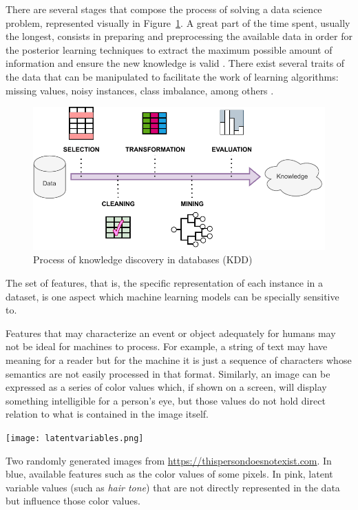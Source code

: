 There are several stages that compose the process of solving a data science problem, represented visually in Figure~\ref{fig:kdd}. A great part of the time spent, usually the longest, consists in preparing and preprocessing the available data in order for the posterior learning techniques to extract the maximum possible amount of information and ensure the new knowledge is valid . There exist several traits of the data that can be manipulated to facilitate the work of learning algorithms: missing values, noisy instances, class imbalance, among others .

\begin{figure}
    \includegraphics[width=\linewidth]{images/kddprocess.pdf}
    \caption{\label{fig:kdd}Process of knowledge discovery in databases (KDD)}
\end{figure}

The set of features, that is, the specific representation of each instance in a dataset, is one aspect which machine learning models can be specially sensitive to.

Features that may characterize an event or object adequately for humans may not be ideal for machines to process. For example, a string of text may have meaning for a reader but for the machine it is just a sequence of characters whose semantics are not easily processed in that format. Similarly, an image can be expressed as a series of color values which, if shown on a screen, will display something intelligible for a person's eye, but those values do not hold direct relation to what is contained in the image itself.

\begin{marginfigure}
\texttt{[image: latentvariables.png]}
\caption{\label{fig:latentfaces}Two randomly generated images from \url{https://thispersondoesnotexist.com}. In blue, available features such as the color values of some pixels. In pink, latent variable values (such as \textit{hair tone}) that are not directly represented in the data but influence those color values.}
\end{marginfigure}

